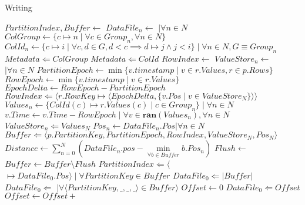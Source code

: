 \documentclass[fleqn]{article}
\begin{document}
\begin{algorithm}
\scriptsize
\caption{Writing}
\begin{algorithmic}[1]
\State $PartitionIndex, Buffer \gets $ 
\State $DataFile_{n} \gets $  $\mid \forall n \in N$
\Statex
\State $ColGroup \gets \{c \mapsto n \mid \forall c \in Group_{n}, \forall n \in N \}$
\State $ColId_{n} \gets \{c \mapsto i \mid \forall c, d \in G, d < c \implies d \mapsto j \wedge j < i \} \mid \forall n \in N, G \equiv Group_{n}$
\State $Metadata \Leftarrow ColGroup$
\State $Metadata \Leftarrow ColId$
\Statex
{} 
 \State $RowIndex \gets $ 
 \State $ValueStore_{n} \gets $  $ \mid \forall n \in N$
 \State $PartitionEpoch \gets \min \{v.timestamp \mid v \in r.Values, r \in p.Rows\}$
 \Statex
   \State $RowEpoch \gets \min \{v.timestamp \mid v \in r.Values\}$
   \State $EpochDelta \gets RowEpoch - PartitionEpoch$
   \State $RowIndex \Leftarrow \langle r.RowKey \mapsto \langle EpochDelta, \{ v.Pos \mid v \in ValueStore_{N} \}\rangle \rangle $ 
   \State $Values_{n} \gets \{ ColId(c) \mapsto r.Values(c) \mid c \in Group_{n} \} \mid \forall n \in N$
   \State $v.Time \gets v.Time - RowEpoch \mid \forall v \in \mathbf{ran}(Values_{n}), \forall n \in N$
   \State $ ValueStore_{n} \Leftarrow Values_{N} $
 \EndFor
\Statex
 \State $Pos_{n} \gets DataFile_{n}.Pos | \forall n \in N$
 \State $Buffer \Leftarrow \langle p.PartitionKey, PartitionEpoch, RowIndex, ValueStore_{N}, Pos_{N} \rangle$
 \State $Distance \gets \sum\limits_{n=0}^{N} (DataFile_{n}.pos - \min\limits_{\forall b \in Buffer} b.Pos_{n}) $
   \State $Flush \gets$ 
   \State {}
   \State $Buffer \gets Buffer \setminus Flush$
 \EndIf
\EndFor
\State {}
\EndProcedure
\Statex
{}
   \State $PartitionIndex \Leftarrow \langle $$ \mapsto DataFile_{0}.Pos \rangle \mid \forall PartitionKey \in Buffer$
   \State $DataFile_{0} \Leftarrow \lvert Buffer \rvert$
   \State $DataFile_{0} \Leftarrow $  $ \mid \forall \langle PartitionKey, \_,\_,\_\rangle \in Buffer \rangle$
   \State $Offset \gets 0$
     \State $DataFile_0 \Leftarrow Offset$
     \State $Offset \gets Offset + $ 

\end{algorithmic}
\end{algorithm}
\end{document}
